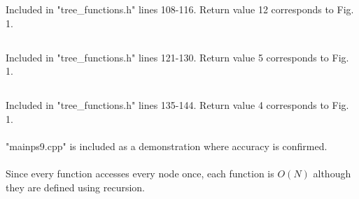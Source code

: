 \documentclass[journal]{IEEEtran}
\begin{document}
\section{}

\subsection{}
    Included in "tree\_functions.h" lines 108-116. Return value 12 corresponds to Fig. 1.
\subsection{}
Included in "tree\_functions.h" lines 121-130. Return value 5 corresponds to Fig. 1.
\subsection{}
Included in "tree\_functions.h" lines 135-144. Return value 4 corresponds to Fig. 1.\\\\
"mainps9.cpp" is included as a demonstration where accuracy is confirmed. \\\\

Since every function accesses every node once, each function is $\boxed{O(N)}$ although they are defined using recursion.
\end{document}
